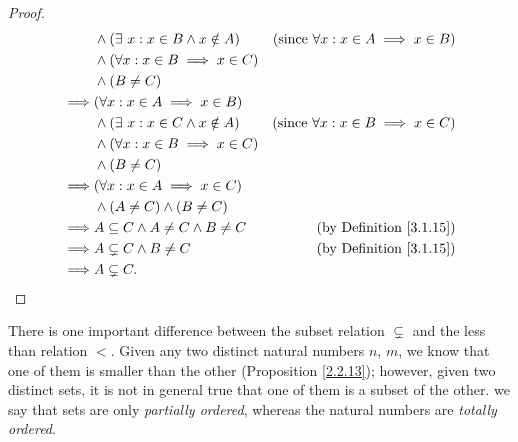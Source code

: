 \begin{proof}
\begin{align*}
                 & \land (\exists\ x : x \in B \land x \notin A)                                   & \text{(since \(\forall x : x \in A \implies x \in B\))} \\
                 & \land (\forall x : x \in B \implies x \in C)                                                                                              \\
                 & \land (B \neq C)                                                                                                                          \\
        \implies & (\forall x : x \in A \implies x \in B)                                                                                                    \\
                 & \land (\exists\ x : x \in C \land x \notin A)                                   & \text{(since \(\forall x : x \in B \implies x \in C\))} \\
                 & \land (\forall x : x \in B \implies x \in C)                                                                                              \\
                 & \land (B \neq C)                                                                                                                          \\
        \implies & (\forall x : x \in A \implies x \in C)                                                                                                    \\
                 & \land (A \neq C) \land (B \neq C)                                                                                                         \\
        \implies & A \subseteq C \land A \neq C \land B \neq C                                     & \text{(by Definition \ref{3.1.15})}                     \\
        \implies & A \subsetneq C \land B \neq C                                                   & \text{(by Definition \ref{3.1.15})}                     \\
        \implies & A \subsetneq C.
    \end{align*}
\end{proof}

\setcounter{theorem}{19}
\begin{remark}\label{3.1.20}
    There is one important difference between the subset relation \(\subsetneq\) and the less than relation \(<\).
    Given any two distinct natural numbers \(n\), \(m\), we know that one of them is smaller than the other (Proposition \ref{2.2.13});
    however, given two distinct sets, it is not in general true that one of them is a subset of the other.
    we say that sets are only \emph{partially ordered}, whereas the natural numbers are \emph{totally ordered}.
\end{remark}

